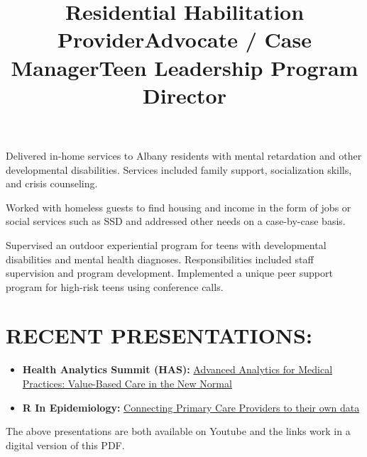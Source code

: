 \documentclass[line, mm, 10pt]{res}
\begin{document}
\begin{resume}
  \title{Residential Habilitation Provider}
  \begin{position}
    Delivered in-home services to Albany residents with mental
    retardation and other developmental disabilities. Services included
    family support, socialization skills, and crisis counseling.
  \end{position}

  \title{Advocate / Case Manager}
  \begin{position}
    Worked with homeless guests to find housing and income in the form of jobs
    or social services such as SSD and addressed other needs on a case-by-case
    basis.
  \end{position}

  \title{Teen Leadership Program Director}
  \begin{position}
    Supervised an outdoor experiential program for teens with developmental
    disabilities and mental health diagnoses. Responsibilities included staff
    supervision and program development. Implemented a unique peer support
    program for high-risk teens using conference calls.
  \end{position}




  \section{RECENT PRESENTATIONS:}
  \begin{itemize}
    \item {\bf Health Analytics Summit (HAS):} {\href{https://www.youtube.com/watch?v=--vqwbJucPs}{Advanced Analytics for Medical Practices: Value-Based Care in the New Normal}}
    \item {\bf R In Epidemiology:} {\href{https://www.youtube.com/watch?v=-zhTXiiCj58}{Connecting Primary Care Providers to their own data}}
    \end{itemize}

    The above presentations are both available on Youtube and the
    links work in a digital version of this PDF.
  

\end{resume}
\end{document}
